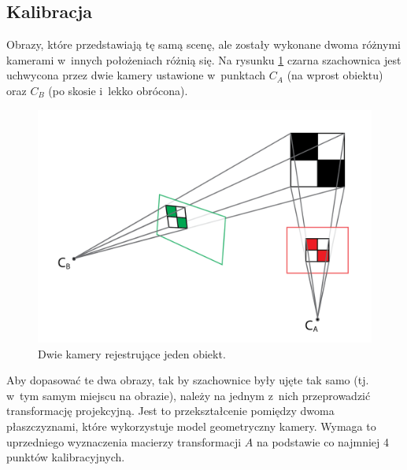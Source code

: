\subsection{Kalibracja}

Obrazy, które przedstawiają tę samą scenę, ale zostały wykonane dwoma różnymi kamerami w~innych położeniach różnią się. 
Na rysunku \ref{fig:oneSceaneTwoCameras} czarna szachownica jest uchwycona przez dwie kamery ustawione w~punktach $C_A$ (na wprost obiektu) oraz $C_B$ (po skosie i~lekko obrócona).

\begin{figure}
\centering
\includegraphics[width=0.6\linewidth]{images/oneSceaneTwoCameras}
\caption[Dwie kamery rejestrujące jeden obiekt. ]{Dwie kamery rejestrujące jeden obiekt.}
\label{fig:oneSceaneTwoCameras}
\end{figure}

Aby dopasować te dwa obrazy, tak by szachownice były ujęte tak samo (tj. w~tym samym miejscu na obrazie), należy na jednym z~nich przeprowadzić transformację projekcyjną. 
Jest to przekształcenie pomiędzy dwoma płaszczyznami, które wykorzystuje model geometryczny kamery. 
Wymaga to uprzedniego wyznaczenia macierzy transformacji $A$ na podstawie co najmniej 4 punktów kalibracyjnych.

